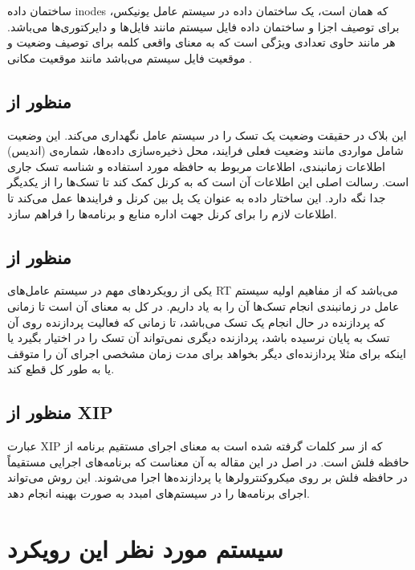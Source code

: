 \documentclass[10pt, a4paper]{article}
\begin{document}
ساختمان داده inodes که همان  است، یک ساختمان داده در سیستم عامل
یونیکس، برای توصیف اجزا و ساختمان داده فایل سیستم مانند فایل‌ها و دایرکتوری‌ها
می‌باشد. هر  مانند  حاوی تعدادی ویژگی است که به
معنای واقعی کلمه برای توصیف وضعیت و موقعیت فایل سیستم می‌باشد مانند موقعیت مکانی
.

\subsection{منظور از }

این بلاک در حقیقت وضعیت یک تسک را در سیستم عامل نگهداری می‌کند. این وضعیت شامل
مواردی مانند وضعیت فعلی فرایند، محل ذخیره‌سازی داده‌ها، شماره‌ی (اندیس) اطلاعات
زمانبندی، اطلاعات مربوط به حافظه مورد استفاده و شناسه تسک جاری است. رسالت اصلی
این اطلاعات آن است که به کرنل کمک کند تا تسک‌ها را از یکدیگر جدا نگه دارد. این
ساختار داده به عنوان یک پل بین کرنل و فرایند‌ها عمل می‌کند تا اطلاعات لازم را
برای کرنل جهت اداره منابع و برنامه‌ها را فراهم سازد.

\subsection{منظور از }

یکی از رویکرد‌های مهم در سیستم عامل‌های RT می‌باشد که از مفاهیم اولیه سیستم عامل
در زمانبندی انجام تسک‌ها آن را به یاد داریم. در کل به معنای آن است تا زمانی که
پردازنده در حال انجام یک تسک می‌باشد، تا زمانی که فعالیت پردازنده روی آن تسک به
پایان نرسیده باشد، پردازنده دیگری نمی‌تواند آن تسک را در اختیار بگیرد یا اینکه
برای مثلا پردازنده‌ای دیگر بخواهد برای مدت زمان مشخصی اجرای آن را متوقف یا به
طور کل قطع کند.

\subsection{منظور از XIP}

عبارت XIP که از سر کلمات  گرفته شده است به معنای اجرای
مستقیم برنامه از حافظه فلش است. در اصل در این مقاله به آن معناست که برنامه‌های
اجرایی مستقیماً در حافظه فلش بر روی میکروکنترولر‌ها یا پردازنده‌ها اجرا می‌شوند.
این روش می‌تواند اجرای برنامه‌ها را در سیستم‌های امبدد به صورت بهینه انجام دهد.


\section{سیستم مورد نظر این رویکرد}
\end{document}
